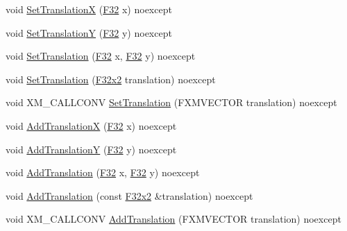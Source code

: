 \begin{DoxyCompactItemize}
\item 
void \mbox{\hyperlink{classmage_1_1_texture_transform_a27831f1102666269024706d42e1b79b0}{Set\+TranslationX}} (\mbox{\hyperlink{namespacemage_aa97e833b45f06d60a0a9c4fc22ae02c0}{F32}} x) noexcept
\item 
void \mbox{\hyperlink{classmage_1_1_texture_transform_a3c8d11ee771bab59e7960c616ff7261e}{Set\+TranslationY}} (\mbox{\hyperlink{namespacemage_aa97e833b45f06d60a0a9c4fc22ae02c0}{F32}} y) noexcept
\item 
void \mbox{\hyperlink{classmage_1_1_texture_transform_aeda73ef35d04ceeb93f29b2e6a16274b}{Set\+Translation}} (\mbox{\hyperlink{namespacemage_aa97e833b45f06d60a0a9c4fc22ae02c0}{F32}} x, \mbox{\hyperlink{namespacemage_aa97e833b45f06d60a0a9c4fc22ae02c0}{F32}} y) noexcept
\item 
void \mbox{\hyperlink{classmage_1_1_texture_transform_ad8d376195941d77086c9ffdb7d49aaf1}{Set\+Translation}} (\mbox{\hyperlink{namespacemage_aee4759dedc8def6c6dec26b5c7eddf29}{F32x2}} translation) noexcept
\item 
void X\+M\+\_\+\+C\+A\+L\+L\+C\+O\+NV \mbox{\hyperlink{classmage_1_1_texture_transform_ad78b5f8482dd2a70ac7cde0aa5877f8c}{Set\+Translation}} (F\+X\+M\+V\+E\+C\+T\+OR translation) noexcept
\item 
void \mbox{\hyperlink{classmage_1_1_texture_transform_a17719b07810b45e0c669a6c6baff345d}{Add\+TranslationX}} (\mbox{\hyperlink{namespacemage_aa97e833b45f06d60a0a9c4fc22ae02c0}{F32}} x) noexcept
\item 
void \mbox{\hyperlink{classmage_1_1_texture_transform_a4c9463ef0b5f3730560093d03b31de15}{Add\+TranslationY}} (\mbox{\hyperlink{namespacemage_aa97e833b45f06d60a0a9c4fc22ae02c0}{F32}} y) noexcept
\item 
void \mbox{\hyperlink{classmage_1_1_texture_transform_a759b5363ddc7621b422ebdc90c9e17af}{Add\+Translation}} (\mbox{\hyperlink{namespacemage_aa97e833b45f06d60a0a9c4fc22ae02c0}{F32}} x, \mbox{\hyperlink{namespacemage_aa97e833b45f06d60a0a9c4fc22ae02c0}{F32}} y) noexcept
\item 
void \mbox{\hyperlink{classmage_1_1_texture_transform_a15f6db6139ba44a3db07f43cce4c1137}{Add\+Translation}} (const \mbox{\hyperlink{namespacemage_aee4759dedc8def6c6dec26b5c7eddf29}{F32x2}} \&translation) noexcept
\item 
void X\+M\+\_\+\+C\+A\+L\+L\+C\+O\+NV \mbox{\hyperlink{classmage_1_1_texture_transform_aa8a4a8d6dec5386a9e83b0c48c30a90a}{Add\+Translation}} (F\+X\+M\+V\+E\+C\+T\+OR translation) noexcept
\item 

\end{DoxyCompactItemize}
